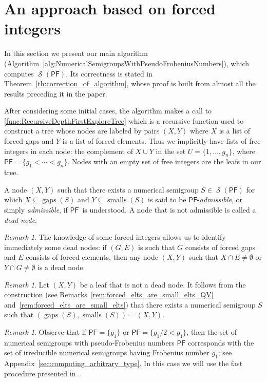 \documentclass[11pt]{amsart}
\theoremstyle{remark}
\newtheorem{remark}[theorem]{Remark}
\begin{document}
\section{An approach based on forced integers}
\label{sec:approach_based_on_forced_integers}
In this section we present our main algorithm (Algorithm~\ref{alg:NumericalSemigroupsWithPseudoFrobeniusNumbers}), which computes $\operatorname{\mathcal{S}}({\ensuremath{\mathsf{PF}}})$. Its correctness is stated in Theorem~\ref{th:correction_of_algorithm}, whose proof is built from almost all the results preceding it in the paper.

After considering some initial cases, the algorithm makes a call to \ref{func:RecursiveDepthFirstExploreTree} which is a recursive function used to construct a tree whose nodes are labeled by pairs $(X,Y)$ where $X$ is a list of forced gaps and $Y$ is a list of forced elements. Thus we implicitly have lists of free integers in each node: the complement of $X\cup Y$ in the set $U=\{1,\ldots, g_{n}\}$, where ${\ensuremath{\mathsf{PF}}}=\{g_1<\cdots < g_n\}$. Nodes with an empty set of free integers are the leafs in our tree. 

A node $(X,Y)$ such that there exists a numerical semigroup $S\in\operatorname{\mathcal{S}}({\ensuremath{\mathsf{PF}}})$ for which $X\subseteq \operatorname{gaps}(S)$ and $Y\subseteq \operatorname{smalls}(S)$ is said to be {\ensuremath{\mathsf{PF}}}-\emph{admissible}, or simply \emph{admissible}, if {\ensuremath{\mathsf{PF}}}\ is understood. A node that is not admissible is called a \emph{dead node}. 

\begin{remark}
The knowledge of some forced integers allows us to identify immediately some dead nodes: if $(G,E)$ is such that $G$ consists of forced gaps and $E$ consists of forced elements, then any node $(X,Y)$ such that $X\cap E\ne \emptyset$ or $Y\cap G\ne \emptyset$ is a dead node.  
\end{remark}

\begin{remark}\label{rem:leaf_semigroup}
Let $(X,Y)$ be a leaf that is not a dead node. It follows from the construction (see Remarks~\ref{rem:forced_elts_are_small_elts_QV} and~\ref{rem:forced_elts_are_small_elts}) that there exists a numerical semigroup $S$ such that $(\operatorname{gaps}(S), \operatorname{smalls}(S)) = (X,Y)$.  
\end{remark}

\begin{remark}\label{rem:call_irr}
	Observe that if ${\ensuremath{\mathsf{PF}}}=\{g_1\}$ or ${\ensuremath{\mathsf{PF}}}=\{g_1/2<g_1\}$, then the set of numerical semigroups with pseudo-Frobenius numbers ${\ensuremath{\mathsf{PF}}}$ corresponds with the set of irreducible numerical semigroups having Frobenius number $g_1$; see Appendix~\ref{sec:computing_arbitrary_type}. In this case we will use the fast procedure presented in \cite{br}.
\end{remark}	
\end{document}
